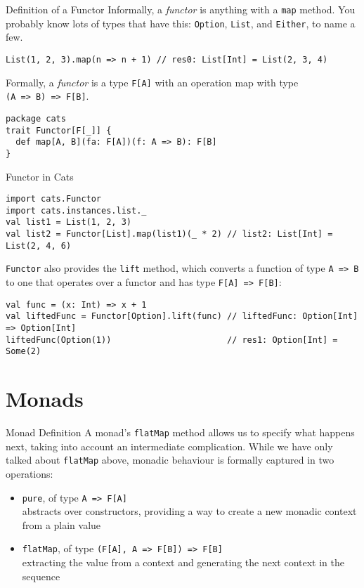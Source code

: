 \documentclass[aspectratio=169]{beamer}
\begin{document}
\begin{frame}[fragile]{Definition of a Functor}
Informally, a \textit{functor} is anything with a \texttt{map} method. You probably know lots of types that have this:
\texttt{Option}, \texttt{List}, and \texttt{Either}, to name a few.
\begin{verbatim}
List(1, 2, 3).map(n => n + 1) // res0: List[Int] = List(2, 3, 4)
\end{verbatim}
\bigskip
Formally, a \textit{functor} is a type \texttt{F[A]} with an operation map with type\\ \texttt{(A => B) => F[B]}. 
\begin{verbatim}
package cats
trait Functor[F[_]] {
  def map[A, B](fa: F[A])(f: A => B): F[B]
}
\end{verbatim}
\end{frame}

\begin{frame}[fragile]{Functor in Cats}
\begin{verbatim}
import cats.Functor
import cats.instances.list._
val list1 = List(1, 2, 3)
val list2 = Functor[List].map(list1)(_ * 2) // list2: List[Int] = List(2, 4, 6)
\end{verbatim}
\bigskip
\texttt{Functor} also provides the \texttt{lift} method, which converts a function of type
\texttt{A => B} to one that operates over a functor and has type \texttt{F[A] => F[B]}:
\begin{verbatim}
val func = (x: Int) => x + 1
val liftedFunc = Functor[Option].lift(func) // liftedFunc: Option[Int] => Option[Int] 
liftedFunc(Option(1))                       // res1: Option[Int] = Some(2)
\end{verbatim}
\end{frame}

\section{Monads}

\begin{frame}[fragile]{Monad Definition}
A monad’s \texttt{flatMap} method allows us to specify what happens next, taking into account an intermediate
complication. While we have only talked about \texttt{flatMap} above, monadic behaviour is formally captured
in two operations:
\begin{itemize}
  \item \texttt{pure}, of type \texttt{A => F[A]} \\
    abstracts over constructors, providing a way to create a new monadic context from a plain value
  \item \texttt{flatMap}, of type \texttt{(F[A], A => F[B]) => F[B]} \\
    extracting the value from a context and generating the next context in the sequence
\end{itemize}
\end{frame}
\end{document}

